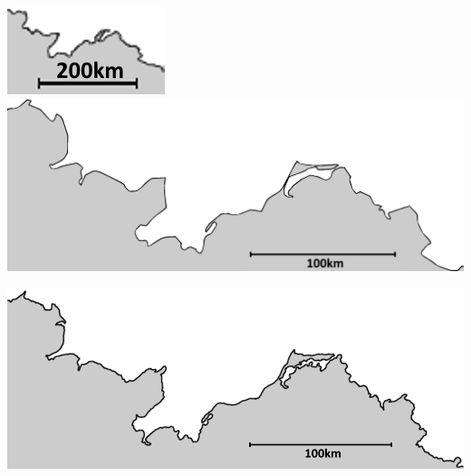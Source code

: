 \documentclass[a4paper,ngerman,12pt]{scrartcl}
\theoremstyle{definition}
\theoremstyle{plain}
\theoremstyle{remark}
\begin{document}
\begin{center}
\includegraphics[width=.25\textwidth]{Bilder/Ostsee1.png}
\includegraphics[width=.65\textwidth]{Bilder/Ostsee2.png}

\includegraphics[width=.9\textwidth]{Bilder/Ostsee3.png}
\end{center}

\newpage
\end{document}
